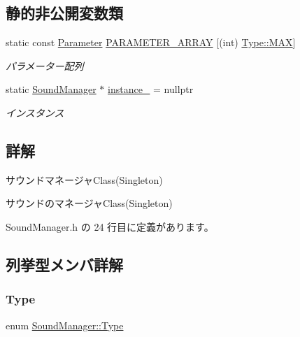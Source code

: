 \subsection*{静的非公開変数類}
\begin{DoxyCompactItemize}
\item 
static const \mbox{\hyperlink{struct_sound_manager_1_1_parameter}{Parameter}} \mbox{\hyperlink{class_sound_manager_aaa51d88b702313608c25be96945d7bc6}{P\+A\+R\+A\+M\+E\+T\+E\+R\+\_\+\+A\+R\+R\+AY}} \mbox{[}(int) \mbox{\hyperlink{class_sound_manager_a0b81fc2281f062cd6489ab281fc3be1da26a4b44a837bf97b972628509912b4a5}{Type\+::\+M\+AX}}\mbox{]}
\begin{DoxyCompactList}\small\item\em パラメーター配列 \end{DoxyCompactList}\item 
static \mbox{\hyperlink{class_sound_manager}{Sound\+Manager}} $\ast$ \mbox{\hyperlink{class_sound_manager_a9b056c7a340bb57b317533d34f679743}{instance\+\_\+}} = nullptr
\begin{DoxyCompactList}\small\item\em インスタンス \end{DoxyCompactList}\end{DoxyCompactItemize}


\subsection{詳解}
サウンドマネージャ\+Class(\+Singleton) 

サウンドのマネージャ\+Class(\+Singleton) 

 Sound\+Manager.\+h の 24 行目に定義があります。



\subsection{列挙型メンバ詳解}
\mbox{\label{class_sound_manager_a0b81fc2281f062cd6489ab281fc3be1d}} 
\subsubsection{\texorpdfstring{Type}{Type}}
{\footnotesize\ttfamily enum \mbox{\hyperlink{class_sound_manager_a0b81fc2281f062cd6489ab281fc3be1d}{Sound\+Manager\+::\+Type}}\hspace{0.3cm}{\ttfamily [strong]}}

